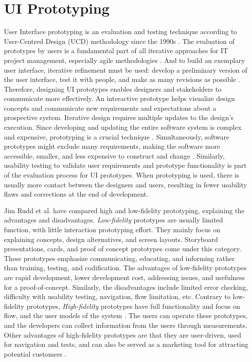 \section{UI Prototyping}
\label{background:section:uiprototyping}
User Interface prototyping is an evaluation and testing technique according to User-Centred Design (UCD) methodology since the 1990s \cite{article:prototyping:preece}. 
The evaluation of prototypes by users is a fundamental part of all iterative approaches for IT project management, especially agile methodologies \cite{article:prototyping:schwaber}.
And to build an exemplary user interface, iterative refinement must be used: develop a preliminary version of the user interface, test it with people, and make as many revisions as possible \cite{article:prototyping:gould}.
Therefore, designing UI prototypes enables designers and stakeholders to communicate more effectively.
An interactive prototype helps visualize design concepts and communicate new requirements and expectations about a prospective system.
Iterative design requires multiple updates to the design's execution.
Since developing and updating the entire software system is complex and expensive, prototyping is a crucial technique \cite{article:prototyping:szekely}.
Simultaneously, software prototypes might exclude many requirements, making the software more accessible, smaller, and less expensive to construct and change \cite{article:prototyping:szekely}. 
Similarly, usability testing to validate user requirements and prototype functionality is part of the evaluation process for UI prototypes.
When prototyping is used, there is usually more contact between the designers and users, resulting in fewer usability flaws and corrections at the end of development.

Jim Rudd et al. \cite{article:prototyping:highlowfidelity} have compared high and low-fidelity prototyping, explaining the advantages and disadvantages.
\textit{Low-fidelity} prototypes are usually limited function, with little interaction prototyping effort. They mainly focus on explaining concepts, design alternatives, and screen layouts. 
Storyboard presentations, cards, and proof of concept prototypes come under this category.
These prototypes emphasize communicating, educating, and informing rather than training, testing, and codification.
The advantages of low-fidelity prototypes are rapid development, lower development cost, addressing issues, and usefulness for a proof-of-concept.
Similarly, the disadvantages include limited error checking, difficulty with usability testing, navigation, flow limitation, etc.
Contrary to low-fidelity prototypes, \textit{High-fidelity} prototypes have full functionality and focus on flow, and the user models of the system \cite{article:prototyping:exploratory}.
The users can operate these prototypes, and the developers can collect information from the users through measurements. 
Other advantages of high-fidelity prototypes are that they are user-driven, used for navigation and tests, and can also be served as a marketing tool for attracting potential customers \cite{article:prototyping:highlowfidelity}.

